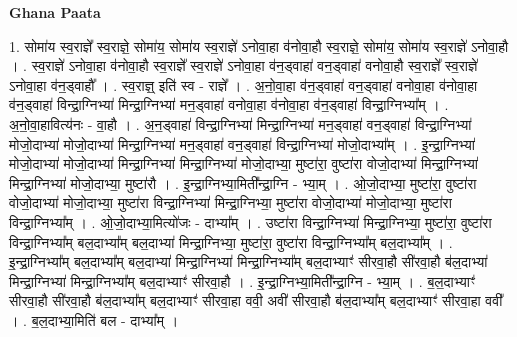 \documentclass[17pt]{extarticle}
\begin{document}
\textbf{Ghana Paata } \newline

1. सोमा॑य स्व॒राज्ञे᳚ स्व॒राज्ञे॒ सोमा॑य॒ सोमा॑य स्व॒राज्ञे॑ ऽनोवा॒हा व॑नोवा॒हौ स्व॒राज्ञे॒ सोमा॑य॒ सोमा॑य स्व॒राज्ञे॑ ऽनोवा॒हौ । . स्व॒राज्ञे॑ ऽनोवा॒हा व॑नोवा॒हौ स्व॒राज्ञे᳚ स्व॒राज्ञे॑ ऽनोवा॒हा व॑न॒ड्वाहा॑ वन॒ड्वाहा॑ वनोवा॒हौ स्व॒राज्ञे᳚ स्व॒राज्ञे॑ ऽनोवा॒हा व॑न॒ड्वाहौ᳚ । . स्व॒राज्ञ्॒ इति॑ स्व - राज्ञे᳚ । . अ॒नो॒वा॒हा व॑न॒ड्वाहा॑ वन॒ड्वाहा॑ वनोवा॒हा व॑नोवा॒हा व॑न॒ड्वाहा॑ विन्द्रा॒ग्निभ्या॑ मिन्द्रा॒ग्निभ्या॑ मन॒ड्वाहा॑ वनोवा॒हा व॑नोवा॒हा व॑न॒ड्वाहा॑ विन्द्रा॒ग्निभ्या᳚म् । . अ॒नो॒वा॒हावित्य॑नः - वा॒हौ । . अ॒न॒ड्वाहा॑ विन्द्रा॒ग्निभ्या॑ मिन्द्रा॒ग्निभ्या॑ मन॒ड्वाहा॑ वन॒ड्वाहा॑ विन्द्रा॒ग्निभ्या॑ मोजो॒दाभ्या॑ मोजो॒दाभ्या॑ मिन्द्रा॒ग्निभ्या॑ मन॒ड्वाहा॑ वन॒ड्वाहा॑ विन्द्रा॒ग्निभ्या॑ मोजो॒दाभ्या᳚म् । . इ॒न्द्रा॒ग्निभ्या॑ मोजो॒दाभ्या॑ मोजो॒दाभ्या॑ मिन्द्रा॒ग्निभ्या॑ मिन्द्रा॒ग्निभ्या॑ मोजो॒दाभ्या॒ मुष्टा॑रा॒ वुष्टा॑रा वोजो॒दाभ्या॑ मिन्द्रा॒ग्निभ्या॑ मिन्द्रा॒ग्निभ्या॑ मोजो॒दाभ्या॒ मुष्टा॑रौ । . इ॒न्द्रा॒ग्निभ्या॒मिती᳚न्द्रा॒ग्नि - भ्या॒म् । . ओ॒जो॒दाभ्या॒ मुष्टा॑रा॒ वुष्टा॑रा वोजो॒दाभ्या॑ मोजो॒दाभ्या॒ मुष्टा॑रा विन्द्रा॒ग्निभ्या॑ मिन्द्रा॒ग्निभ्या॒ मुष्टा॑रा वोजो॒दाभ्या॑ मोजो॒दाभ्या॒ मुष्टा॑रा विन्द्रा॒ग्निभ्या᳚म् । . ओ॒जो॒दाभ्या॒मित्यो॑जः - दाभ्या᳚म् । . उष्टा॑रा विन्द्रा॒ग्निभ्या॑ मिन्द्रा॒ग्निभ्या॒ मुष्टा॑रा॒ वुष्टा॑रा विन्द्रा॒ग्निभ्या᳚म् बल॒दाभ्या᳚म् बल॒दाभ्या॑ मिन्द्रा॒ग्निभ्या॒ मुष्टा॑रा॒ वुष्टा॑रा विन्द्रा॒ग्निभ्या᳚म् बल॒दाभ्या᳚म् । . इ॒न्द्रा॒ग्निभ्या᳚म् बल॒दाभ्या᳚म् बल॒दाभ्या॑ मिन्द्रा॒ग्निभ्या॑ मिन्द्रा॒ग्निभ्या᳚म् बल॒दाभ्याꣳ॑ सीरवा॒हौ सी॑रवा॒हौ ब॑ल॒दाभ्या॑ मिन्द्रा॒ग्निभ्या॑ मिन्द्रा॒ग्निभ्या᳚म् बल॒दाभ्याꣳ॑ सीरवा॒हौ । . इ॒न्द्रा॒ग्निभ्या॒मिती᳚न्द्रा॒ग्नि - भ्या॒म् । . ब॒ल॒दाभ्याꣳ॑ सीरवा॒हौ सी॑रवा॒हौ ब॑ल॒दाभ्या᳚म् बल॒दाभ्याꣳ॑ सीरवा॒हा ववी॒ अवी॑ सीरवा॒हौ ब॑ल॒दाभ्या᳚म् बल॒दाभ्याꣳ॑ सीरवा॒हा ववी᳚ । . ब॒ल॒दाभ्या॒मिति॑ बल - दाभ्या᳚म् । \newline
\end{document}
